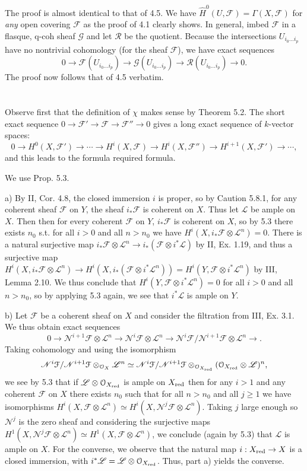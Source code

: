 \documentclass{report}
\renewcommand{\L}{\mathscr{L}}
\newcommand{\F}{\mathcal{F}}
\renewcommand{\O}{\mathcal{O}}
\newcommand{\G}{\mathcal{G}}
\newcommand{\N}{\mathscr{N}}
\begin{document}
\bigskip
{}	The proof is almost identical to that of 4.5.  We have $\widehat{H}^0(U,\F)=\Gamma(X,\F)$ for {\em any}
open covering $\F$ as the proof of 4.1 clearly shows.  In general, imbed $\F$ in a flasque, q-coh sheaf $\G$
and let $\mathcal{R}$ be the quotient.  Because the intersections $U_{i_0\ldots i_p}$ have no nontrivial
cohomology (for the sheaf $\F$), we have exact sequences 
$$0\rightarrow \F(U_{i_0\ldots i_p})\rightarrow \G(U_{i_0\ldots i_p})\rightarrow \mathcal{R}(U_{i_0\ldots i_p})\rightarrow 0.$$
The proof now follows that of 4.5 verbatim.


\section{}

\bigskip
{}	Observe first that the definition of $\chi$ makes sense by Theorem 5.2.  
The short exact sequence $0\rightarrow \F'\rightarrow \F\rightarrow \F''\rightarrow 0$ gives a long exact sequence
of $k$-vector spaces:
$$0\rightarrow H^0(X,\F')\rightarrow \cdots\rightarrow H^i(X,\F)\rightarrow H^i(X,\F'')\rightarrow H^{i+1}(X,\F')\rightarrow\cdots,$$
and this leads to the formula required formula.

\bigskip
{}	We use Prop. 5.3.

\noindent
a) By II, Cor. 4.8, the closed immersion $i$ is proper, so by Caution 5.8.1, for any coherent sheaf $\F$
on $Y$, the sheaf $i_*\F$ is coherent on $X$.
Thus let $\L$ be ample on $X$.  Then
then for every coherent $\F$ on $Y$, $i_*\F$ is coherent on $X$, so by 5.3 there exists $n_0$ s.t. for all $i>0$
and all $n>n_0$ we have $H^i(X,i_*\F \otimes \L^n)=0$.
There is a natural surjective map $i_*\F \otimes \L^n \rightarrow i_*(\F \otimes i^*\L)$ by II, Ex. 1.19,
and thus a surjective map $H^i(X,i_*\F\otimes\L^n)\rightarrow H^i(X,i_*(\F\otimes i^*\L^n))=H^i(Y, \F\otimes i^*\L^n)$
by III, Lemma 2.10.  We thus conclude that $H^i(Y, \F\otimes i^*\L^n)=0$ for all $i>0$ and all $n>n_0$,
so by applying 5.3 again, we see that $i^*\L$ is ample on $Y$.  

\noindent
b)	Let $\F$ be a coherent sheaf on $X$ and consider the filtration from III, Ex. 3.1.  We thus obtain exact sequences
$$0\rightarrow \N^{i+1} \F\otimes \L^n \rightarrow \N^i\F\otimes \L^n \rightarrow \N^i\F/\N^{i+1}\F\otimes \L^n \rightarrow.$$
Taking cohomology and using the isomorphism
$$\N^i\F/\N^{i+1}\F\otimes_{\O_X}\L^n \simeq \N^i\F/\N^{i+1}\F\otimes_{\O_{X_{\rm red}}} (\O_{X_{\rm red}}\otimes \L)^n,$$
we see by 5.3 that if $\L\otimes \O_{X_{\rm red}}$ is ample on $X_{\rm red}$ then for any $i>1$ and any coherent $\F$ on $X$
there exists $n_0$ such that for all $n>n_0$ and all $j\ge1$ we have isomorphisms 
$H^i(X,\F\otimes \L^n)\simeq H^i(X,\N^j\F\otimes \L^n)$.  Taking $j$ large enough so $\N^j$ is the zero sheaf and considering the surjective maps
$H^1(X,\N^j\F\otimes \L^n)\simeq H^1(X,\F\otimes \L^n)$, we conclude (again by 5.3) that $\L$ is ample on $X$.
For the converse, we observe that the natural map $i:X_{\rm red}\rightarrow X$ is a closed immersion, with $i^*\L=\L\otimes \O_{X_{\rm red}}$.
Thus, part a) yields the converse.
\end{document}
